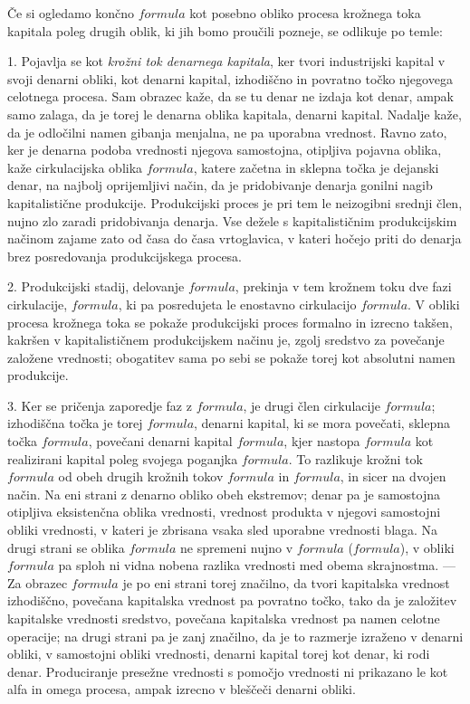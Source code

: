 \documentclass[kapital_02.tex]{subfiles}
\begin{document}
Če si ogledamo končno \( formula \) kot posebno obliko procesa krožnega toka kapitala poleg drugih oblik, ki jih bomo proučili pozneje, se odlikuje po temle:

1. Pojavlja se kot \emph{krožni tok denarnega kapitala}, ker tvori industrijski kapital v svoji denarni obliki, kot denarni kapital, izhodiščno in povratno točko njegovega celotnega procesa. Sam obrazec kaže, da se tu denar ne izdaja kot denar, ampak samo zalaga, da je torej le denarna oblika kapitala, denarni kapital. Nadalje kaže, da je odločilni namen gibanja menjalna, ne pa uporabna vrednost. Ravno zato, ker je denarna podoba vrednosti njegova samostojna, otipljiva pojavna oblika, kaže cirkulacijska oblika \( formula \), katere začetna in sklepna točka je dejanski denar, na najbolj oprijemljivi način, da je pridobivanje denarja gonilni nagib kapitalistične produkcije. Produkcijski proces je pri tem le neizogibni srednji člen, nujno zlo zaradi pridobivanja denarja. Vse dežele s kapitalističnim produkcijskim načinom zajame zato od časa do časa vrtoglavica, v kateri hočejo priti do denarja brez posredovanja produkcijskega procesa.

2. Produkcijski stadij, delovanje \( formula \), prekinja v tem krožnem toku dve fazi cirkulacije, \( formula \), ki pa posredujeta le enostavno cirkulacijo \( formula \). V obliki procesa krožnega toka se pokaže produkcijski proces formalno in izrecno takšen, kakršen v kapitalističnem produkcijskem načinu je, zgolj sredstvo za povečanje založene vrednosti; obogatitev sama po sebi se pokaže torej kot absolutni namen produkcije.

3. Ker se pričenja zaporedje faz z \( formula \), je drugi člen cirkulacije \( formula \); izhodiščna točka je torej \( formula \), denarni kapital, ki se mora povečati, sklepna točka \( formula \), povečani denarni kapital \( formula \), kjer nastopa \( formula \) kot realizirani kapital poleg svojega poganjka \( formula \). To razlikuje krožni tok \( formula \) od obeh drugih krožnih tokov \( formula \) in \( formula \), in sicer na dvojen način. Na eni strani z denarno obliko obeh ekstremov; denar pa je samostojna otipljiva eksistenčna oblika vrednosti, vrednost produkta v njegovi samostojni obliki vrednosti, v kateri je zbrisana vsaka sled uporabne vrednosti blaga. Na drugi strani se oblika \( formula \) ne spremeni nujno v \( formula \) (\( formula \)), v obliki \( formula \) pa sploh ni vidna nobena razlika vrednosti med obema skrajnostma. --- Za obrazec \( formula \) je po eni strani torej značilno, da tvori kapitalska vrednost izhodiščno, povečana kapitalska vrednost pa povratno točko, tako da je založitev kapitalske vrednosti sredstvo, povečana kapitalska vrednost pa namen celotne operacije; na drugi strani pa je zanj značilno, da je to razmerje izraženo v denarni obliki, v samostojni obliki vrednosti, denarni kapital torej kot denar, ki rodi denar. Produciranje presežne vrednosti s pomočjo vrednosti ni prikazano le kot alfa in omega procesa, ampak izrecno v bleščeči denarni obliki.
\end{document}
